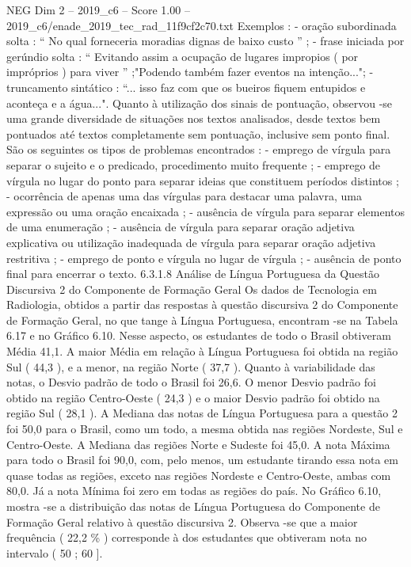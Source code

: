 \begin{textsample}{NEG Dim 2 – 2019\_c6 – Score 1.00 – 2019\_c6/enade\_2019\_tec\_rad\_11f9cf2c70.txt}
Exemplos : - oração subordinada solta : “ No qual forneceria moradias dignas de baixo custo ” ; - frase iniciada por gerúndio solta : “ Evitando assim a ocupação de lugares impropios ( por impróprios ) para viver ” ;"Podendo também fazer eventos na intenção..."; - truncamento sintático : “... isso faz com que os bueiros fiquem entupidos e aconteça e a água...".
Quanto à utilização dos sinais de pontuação, observou -se uma grande diversidade de situações nos textos analisados, desde textos bem pontuados até textos completamente sem pontuação, inclusive sem ponto final.
São os seguintes os tipos de problemas encontrados : - emprego de vírgula para separar o sujeito e o predicado, procedimento muito frequente ; - emprego de vírgula no lugar do ponto para separar ideias que constituem períodos distintos ; - ocorrência de apenas uma das vírgulas para destacar uma palavra, uma expressão ou uma oração encaixada ; - ausência de vírgula para separar elementos de uma enumeração ; - ausência de vírgula para separar oração adjetiva explicativa ou utilização inadequada de vírgula para separar oração adjetiva restritiva ; - emprego de ponto e vírgula no lugar de vírgula ; - ausência de ponto final para encerrar o texto. 6.3.1.8 Análise de Língua Portuguesa da Questão Discursiva 2 do Componente de Formação Geral Os dados de Tecnologia em Radiologia, obtidos a partir das respostas à questão discursiva 2 do Componente de Formação Geral, no que tange à Língua Portuguesa, encontram -se na Tabela 6.17 e no Gráfico 6.10.
Nesse aspecto, os estudantes de todo o Brasil obtiveram Média 41,1.
A maior Média em relação à Língua Portuguesa foi obtida na região Sul ( 44,3 ), e a menor, na região Norte ( 37,7 ).
Quanto à variabilidade das notas, o Desvio padrão de todo o Brasil foi 26,6.
O menor Desvio padrão foi obtido na região Centro-Oeste ( 24,3 ) e o maior Desvio padrão foi obtido na região Sul ( 28,1 ).
A Mediana das notas de Língua Portuguesa para a questão 2 foi 50,0 para o Brasil, como um todo, a mesma obtida nas regiões Nordeste, Sul e Centro-Oeste.
A Mediana das regiões Norte e Sudeste foi 45,0.
A nota Máxima para todo o Brasil foi 90,0, com, pelo menos, um estudante tirando essa nota em quase todas as regiões, exceto nas regiões Nordeste e Centro-Oeste, ambas com 80,0.
Já a nota Mínima foi zero em todas as regiões do país.
No Gráfico 6.10, mostra -se a distribuição das notas de Língua Portuguesa do Componente de Formação Geral relativo à questão discursiva 2.
Observa -se que a maior frequência ( 22,2 \% ) corresponde à dos estudantes que obtiveram nota no intervalo ( 50 ; 60 ].

\end{textsample}
